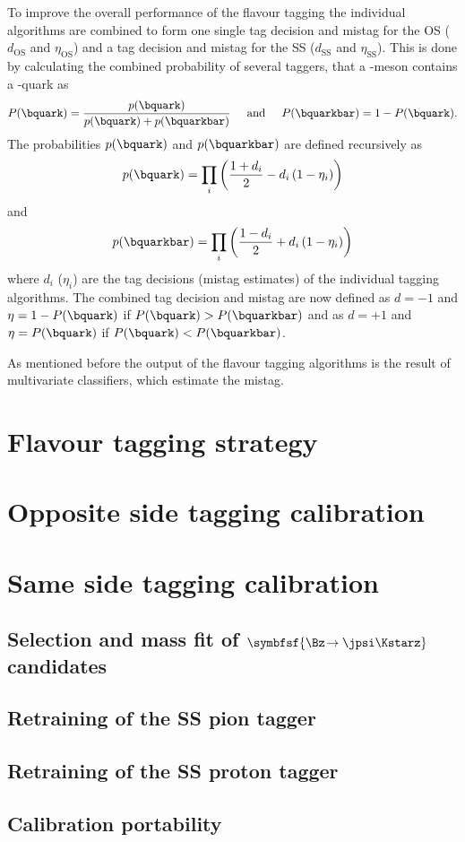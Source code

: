 To improve the overall performance of the flavour tagging the individual algorithms are combined to form one single tag decision and mistag for the OS ($d_{\text{OS}}$ and $\eta_{\text{OS}}$) and a tag decision and mistag for the SS ($d_{\text{SS}}$ and $\eta_{\text{SS}}$).
This is done by calculating the combined probability of several taggers, that a \B-meson contains a \bquark-quark as
\begin{equation}
P(\bquark)=\frac{p(\bquark)}{p(\bquark)+p(\bquarkbar)}\hspace{0.5cm}\text{and}\hspace{0.5cm}P(\bquarkbar)=1-P(\bquark).
\end{equation}
The probabilities $p(\bquark)$ and $p(\bquarkbar)$ are defined recursively as
\begin{equation}
p(\bquark)=\prod_{i}\left(\frac{1+d_i}{2}-d_i\left(1-\eta_i\right)\right)
\end{equation}
and
\begin{equation}
p(\bquarkbar)=\prod_{i}\left(\frac{1-d_i}{2}+d_i\left(1-\eta_i\right)\right)
\end{equation}
where $d_i$ ($\eta_i$) are the tag decisions (mistag estimates) of the individual tagging algorithms.
The combined tag decision and mistag are now defined as $d=-1$ and $\eta=1-P(\bquark)$ if $P(\bquark)>P(\bquarkbar)$ and as $d=+1$ and $\eta=P(\bquark)$ if $P(\bquark)<P(\bquarkbar)$.

As mentioned before the output of the flavour tagging algorithms is the result of multivariate classifiers, which estimate the mistag.


\section{Flavour tagging strategy}
\label{sec:taggingstrategy}


\section{Opposite side tagging calibration}
\label{sec:OScalibration}


\section{Same side tagging calibration}
\label{sec:SScalibration}

\subsection[head={Selection and mass fit of $\Bz\!\to\jpsi\Kstarz$ candidates},tocentry={Selection and mass fit of $\Bz\!\to\jpsi\Kstarz$ candidates}]{Selection and mass fit of $\symbfsf{\Bz\!\to\jpsi\Kstarz}$ candidates}


\subsection{Retraining of the SS pion tagger}


\subsection{Retraining of the SS proton tagger}


\subsection{Calibration portability}
